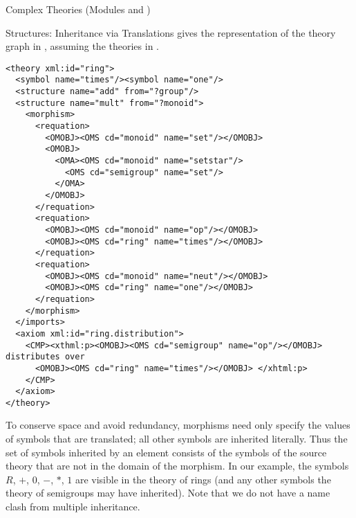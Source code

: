 \begin{tchapter}[id=complex-theories,short=Complex Theories]{Complex Theories (Modules
     and )}
\begin{tsection}[id=morphisms]{Structures: Inheritance via Translations}
 gives the \omdoc representation of the theory graph in
, assuming the theories in .

\begin{lstlisting}[label=lst:rings,
  caption={A Theory of Rings by Inheritance Via Renaming},
  index={derive,method,premise}]
<theory xml:id="ring"> 
  <symbol name="times"/><symbol name="one"/> 
  <structure name="add" from="?group"/>
  <structure name="mult" from="?monoid">
    <morphism> 
      <requation> 
        <OMOBJ><OMS cd="monoid" name="set"/></OMOBJ>
        <OMOBJ>
          <OMA><OMS cd="monoid" name="setstar"/>
            <OMS cd="semigroup" name="set"/>
          </OMA>
        </OMOBJ>
      </requation> 
      <requation> 
        <OMOBJ><OMS cd="monoid" name="op"/></OMOBJ>
        <OMOBJ><OMS cd="ring" name="times"/></OMOBJ>
      </requation> 
      <requation>
        <OMOBJ><OMS cd="monoid" name="neut"/></OMOBJ>
        <OMOBJ><OMS cd="ring" name="one"/></OMOBJ>
      </requation> 
    </morphism> 
  </imports> 
  <axiom xml:id="ring.distribution"> 
    <CMP><xthml:p><OMOBJ><OMS cd="semigroup" name="op"/></OMOBJ> distributes over 
      <OMOBJ><OMS cd="ring" name="times"/></OMOBJ> </xhtml:p>
    </CMP> 
  </axiom>
</theory>
\end{lstlisting}

To conserve space and avoid redundancy, \omdoc morphisms need only specify the values of
symbols that are translated; all other symbols are inherited literally.  Thus the set of
symbols inherited by an  element consists of the symbols of the source
theory that are not in the domain of the morphism. In our example, the symbols $R$, $+$,
$0$, $-$, $*$, $1$ are visible in the theory of rings (and any other symbols the theory of
semigroups may have inherited). Note that we do not have a name clash from multiple
inheritance.
  

\end{tsection}
\end{tchapter}
